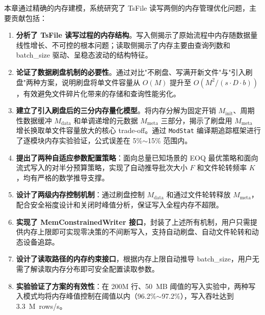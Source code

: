 本章通过精确的内存建模，系统研究了 TsFile 读写两侧的内存管理优化问题，主要贡献包括：

\begin{enumerate}
  \item \textbf{分析了 TsFile 读写过程的内存结构}。写入侧揭示了原始流程中内存随数据量线性增长、不可控的根本问题；读取侧揭示了内存主要由查询列数和 batch\_size 驱动、呈稳态波动的结构特征。
  \item \textbf{论证了数据刷盘机制的必要性}。通过对比"不刷盘、写满开新文件"与"引入刷盘"两种方案，说明刷盘将单文件容量从 $O(M)$ 提升至 $O(M^2/(s \cdot D \cdot b))$，有效避免文件碎片化带来的存储和查询性能劣化。
  \item \textbf{建立了引入刷盘后的三分内存量化模型}。将内存分解为固定开销 $M_{\text{init}}$、周期性数据缓冲 $M_{\text{data}}$ 和单调递增的元数据 $M_{\text{meta}}$ 三部分，揭示了刷盘用 $M_{\text{meta}}$ 增长换取单文件容量放大的核心 trade-off。通过 \texttt{ModStat} 编译期追踪框架进行了逐模块内存实验验证，公式误差在 5\%$\sim$15\% 范围内。
  \item \textbf{提出了两种自适应参数配置策略}：面向总量已知场景的 EOQ 最优策略和面向流式写入的对半分预算策略，实现了自动推导批次大小 $F$ 和文件轮转频率 $K$，均有严格的数学推导支撑。
  \item \textbf{设计了两级内存控制机制}：通过刷盘控制 $M_{\text{data}}$ 和通过文件轮转释放 $M_{\text{meta}}$，配合安全裕度设计和关闭时峰值分析，保证写入全程内存不超限。
  \item \textbf{实现了 MemConstrainedWriter 接口}，封装了上述所有机制，用户只需提供内存上限即可实现零决策的不间断写入，支持自动刷盘、自动文件轮转和动态设备追踪。
  \item \textbf{设计了读取路径的内存约束接口}，根据内存上限自动推导 batch\_size，用户无需了解读取内存分布即可安全配置读取参数。
  \item \textbf{实验验证了方案的有效性}：在 200M 行、50~MB 阈值的写入实验中，两种写入模式均将内存峰值控制在阈值以内（96.2\%$\sim$97.2\%），写入吞吐达到 3.3~M~rows/s。
\end{enumerate}
